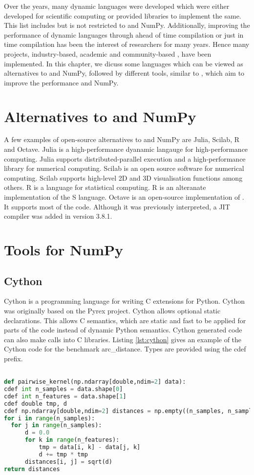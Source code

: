 Over the years, many dynamic languages were developed which were either developed for scientific computing or provided libraries to implement the same. This list includes but is not restricted to \matlab\cite{matlb} and NumPy\cite{numpy}. Additionally, improving the performance of dynamic languages through ahead of time compilation or just in time compilation has been the interest of researchers for many years. Hence many projects, industry-based, academic and community-based , have been implemented. In this chapter, we dicuss some languages which can be viewed as alternatives to \matlab and NumPy, followed by different tools, similar to \velocty, which aim to improve the performance \matlab and NumPy.
\section{Alternatives to \matlab and NumPy}
A few examples of open-source alternatives to \matlab and NumPy are Julia\cite{julia}, Scilab\cite{scilab}, R\cite{rlang} and Octave\cite{octave}. Julia is a high-performance dyanamic langauge for high-performance computing. Julia supports distributed-parallel execution and a high-performance library for numerical computing. Scilab is an open source software for numerical computing. Scilab supports high-level 2D and 3D visualisation functions among others. R is a language for statistical computing. R is an alteranate implementation of the S language. Octave is an open-source implementation of \matlab. It supports most of the \matlab code. Although it was previously interpreted, a JIT compiler was added in version 3.8.1.
\section{Tools for NumPy}
\subsection{Cython}
Cython is a programming language for writing C extensions for Python. Cython was originally based on the Pyrex project\cite{pyrex}.  Cython allows optional static declarations. This allows C semantics, which are static and fast to be applied for parts of the code instead of dynamic Python semantics. Cython generated code can also make calls into C libraries. Listing \ref{lst:cython} gives an example of the Cython code for the benchmark arc\_distance. Types are provided using the \textsf{cdef} prefix. 

\begin{lstlisting}[language=python, label={lst:cython}, caption={ The Cython code with static type annotations that will is taken as input by Cython to generate C code. The example is of the arc\_distance benchmark}]

def pairwise_kernel(np.ndarray[double,ndim=2] data):
cdef int n_samples = data.shape[0]
cdef int n_features = data.shape[1]
cdef double tmp, d
cdef np.ndarray[double,ndim=2] distances = np.empty((n_samples, n_samples))
for i in range(n_samples):
  for j in range(n_samples):
	  d = 0.0
	  for k in range(n_features):
		  tmp = data[i, k] - data[j, k]
		  d += tmp * tmp
	  distances[i, j] = sqrt(d)
return distances
\end{lstlisting}

